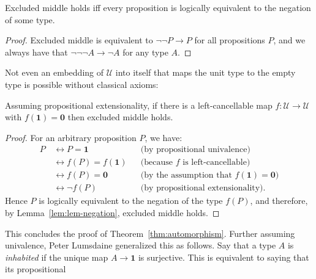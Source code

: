 \documentclass[a4paper,UKenglish]{lipics-v2016}
\newcommand{\UU}{\mathcal{U}}
\newcommand{\Empty}{\mathbf{0}}
\newcommand{\unit}{\mathbf{1}}
\begin{document}
\begin{lemma}
\label{lem:lem-negation}
  Excluded middle holds iff every proposition is logically equivalent
  to the negation of some type.
\end{lemma}
\begin{proof}
  Excluded middle is equivalent to $\neg \neg P \to P$ for all
  propositions $P$, and we always have that
  $\neg\neg\neg A \to \neg A$ for any type $A$.
\end{proof}

Not even an embedding of $\UU$ into itself that maps the unit type to
the empty type is possible without classical axioms:
\begin{lemma} \label{left:cancellable} Assuming propositional
  extensionality, if there is a left-cancellable map $f: \UU \to \UU$
  with $f(\unit)=\Empty$ then excluded middle holds.
\end{lemma}
\begin{proof}
  For an arbitrary proposition $P$, we have:
  \begin{align*}
    P \,\!& \leftrightarrow  P = \unit \quad
    && \mbox{(by propositional univalence)}
    \\
        &\leftrightarrow  f(P)=f(\unit)
    && \mbox{(because $f$ is left-cancellable)}
    \\
        &\leftrightarrow f(P)=\Empty
    && \mbox{(by the assumption that $f(\unit)=\Empty$)}
    \\
        &\leftrightarrow \neg f(P)
          && \mbox{(by propositional extensionality).}
  \end{align*}
  Hence $P$ is logically equivalent to the negation of the type
  $f(P)$, and therefore, by Lemma~\ref{lem:lem-negation}, excluded
  middle holds.
\end{proof}
This concludes the proof of Theorem~\ref{thm:automorphism}. Further
assuming univalence, Peter Lumsdaine generalized this as follows.  Say
that a type $A$ is \emph{inhabited} if the unique map $A\to\unit$ is
surjective. This is equivalent to saying that its propositional
\end{document}
